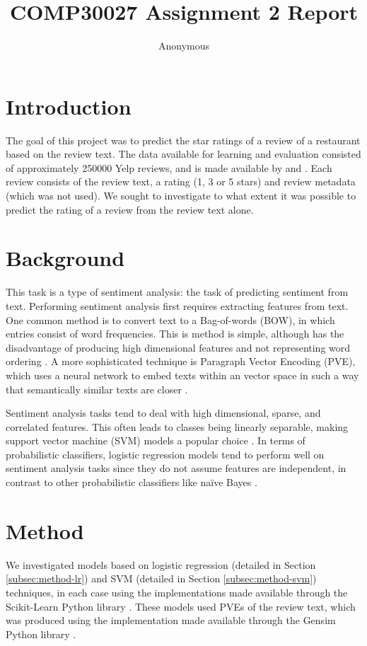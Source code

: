\documentclass[11pt]{article}
\title{COMP30027 Assignment 2 Report}
\author
{Anonymous}
\begin{document}
\maketitle

\section{Introduction}
The goal of this project was to predict the star ratings of a review of a restaurant based on the review text. The data available for learning and evaluation consisted of approximately 250000 Yelp reviews, and is made available by \cite{medhat_sentiment_2014} and \cite{rayana_collective_2015}. Each review consists of the review text, a rating (1, 3 or 5 stars) and review metadata (which was not used). We sought to investigate to what extent it was possible to predict the rating of a review from the review text alone. 

\section{Background}
This task is a type of sentiment analysis: the task of predicting sentiment from text. Performing sentiment analysis first requires extracting features from text. One common method is to convert text to a Bag-of-words (BOW), in which entries consist of word frequencies. This is method is simple, although has the disadvantage of producing high dimensional features and not representing word ordering \cite{le_distributed_2014}. A more sophisticated technique is Paragraph Vector Encoding (PVE), which uses a neural network to embed texts within an vector space in such a way that semantically similar texts are closer \cite{le_distributed_2014}.

Sentiment analysis tasks tend to deal with high dimensional, sparse, and correlated features. This often leads to classes being linearly separable, making support vector machine (SVM) models a popular choice \cite{medhat_sentiment_2014}. In terms of probabilistic classifiers, logistic regression models tend to perform well on sentiment analysis tasks since they do not assume features are independent, in contrast to other probabilistic classifiers like na\"{i}ve Bayes \cite{medhat_sentiment_2014}.

\section{Method} \label{sec:method}
We investigated models based on logistic regression (detailed in Section \ref{subsec:method-lr}) and SVM (detailed in Section \ref{subsec:method-svm}) techniques, in each case using the implementations made available through the Scikit-Learn Python library \cite{sklearn_pedregosa_scikit-learn_2011}. These models used PVEs of the review text, which was produced using the implementation made available through the Gensim Python library \cite{gensim_rehurek_software_2010}. 
\end{document}
